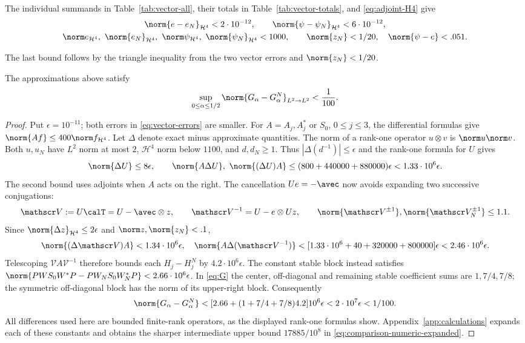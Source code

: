 The individual summands in Table~\ref{tab:vector-all}, their totals in Table~\ref{tab:vector-totals}, and \eqref{eq:adjoint-H4} give
\begin{equation}\label{eq:vector-errors}
\begin{gathered}
 \norm{e-e_N}_{\mathcal H^4}<2\cdot10^{-12},\qquad
 \norm{\psi-\psi_N}_{\mathcal H^4}<6\cdot10^{-12},\\
 \norm e_{\mathcal H^4},\ \norm{e_N}_{\mathcal H^4},\
 \norm\psi_{\mathcal H^4},\ \norm{\psi_N}_{\mathcal H^4}<1000,
 \qquad \norm{z_N}<1/20,\quad \norm{\psi-e}<.051.
\end{gathered}
\end{equation}

The last bound follows by the triangle inequality from the two vector errors and $\norm{z_N}<1/20$.

\begin{lemma}\label{lem:comparison}
The approximations above satisfy
\begin{equation}\label{eq:comparison-small}
 \sup_{0\le\alpha\le1/2}\norm{G_\alpha-G_\alpha^N}_{L^2\to L^2}<\frac1{100}.
\end{equation}
\end{lemma}
\begin{proof}
Put $\epsilon=10^{-11}$; both errors in \eqref{eq:vector-errors} are smaller.
For $A=A_j,A_j^*$ or $S_0$, $0\le j\le3$, the differential formulas give
$\norm{Af}\le400\norm f_{\mathcal H^4}$. Let $\Delta$ denote exact minus approximate quantities. The norm of a rank-one operator $u\otimes v$ is $\norm u\norm v$. Both $u,u_N$ have $L^2$ norm at most $2$, $\mathcal H^4$ norm below $1100$, and $d,d_N\ge1$. Thus $|\Delta(d^{-1})|\le\epsilon$ and the rank-one formula for $U$ gives
\[
 \norm{\Delta U}\le8\epsilon,\qquad
 \norm{A\Delta U},\ \norm{(\Delta U)A}
 \le(800+440000+880000)\epsilon<1.33\cdot10^6\epsilon.
\]
The second bound uses adjoints when $A$ acts on the right.
The cancellation $Ue=-\avec$ now avoids expanding two successive conjugations:
\[
 \mathscr V:=U\calT=U-\avec\otimes z,\qquad
 \mathscr V^{-1}=U-e\otimes Uz,\qquad
 \norm{\mathscr V^{\pm1}},\norm{\mathscr V_N^{\pm1}}\le1.1.
\]
Since $\norm{\Delta z}_{\mathcal H^4}\le2\epsilon$ and $\norm z,\norm{z_N}<.1$,
\[
 \norm{(\Delta\mathscr V)A}<1.34\cdot10^6\epsilon,
 \quad
 \norm{A\Delta(\mathscr V^{-1})}
 <[1.33\cdot10^6+40+320000+800000]\epsilon
 <2.46\cdot10^6\epsilon.
\]
Telescoping $\mathscr VA\mathscr V^{-1}$ therefore bounds each $H_j-H_j^N$ by $4.2\cdot10^6\epsilon$. The constant stable block instead satisfies $\norm{PW S_0W^*P-PW_NS_0W_N^*P}<2.66\cdot10^6\epsilon$. In \eqref{eq:G} the center, off-diagonal and remaining stable coefficient sums are $1,7/4,7/8$; the symmetric off-diagonal block has the norm of its upper-right block. Consequently
\[
 \norm{G_\alpha-G_\alpha^N}
 <[2.66+(1+7/4+7/8)4.2]10^6\epsilon<2\cdot10^7\epsilon<1/100.
\]
All differences used here are bounded finite-rank operators, as the displayed rank-one formulas show. Appendix~\ref{app:calculations} expands each of these constants and obtains the sharper intermediate upper bound $17885/10^8$ in \eqref{eq:comparison-numeric-expanded}.
\end{proof}

